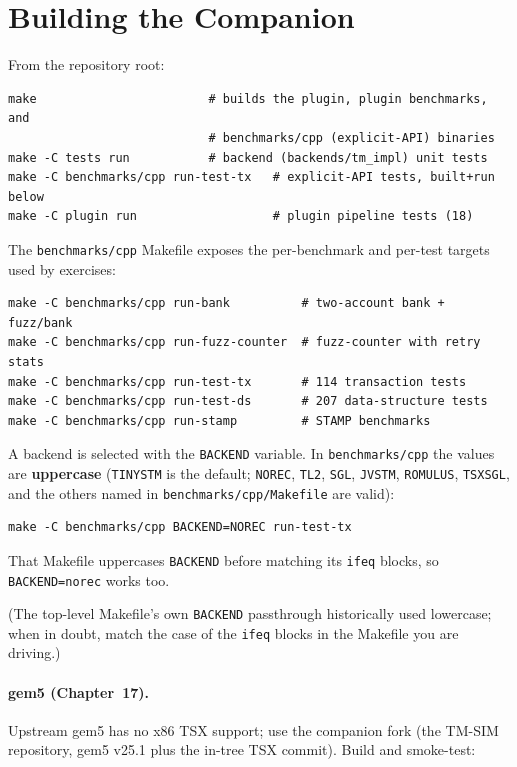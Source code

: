 \section{Building the Companion}

From the repository root:

\begin{verbatim}
make                        # builds the plugin, plugin benchmarks, and
                            # benchmarks/cpp (explicit-API) binaries
make -C tests run           # backend (backends/tm_impl) unit tests
make -C benchmarks/cpp run-test-tx   # explicit-API tests, built+run below
make -C plugin run                   # plugin pipeline tests (18)
\end{verbatim}

The \texttt{benchmarks/cpp} Makefile exposes the per-benchmark and per-test
targets used by exercises:

\begin{verbatim}
make -C benchmarks/cpp run-bank          # two-account bank + fuzz/bank
make -C benchmarks/cpp run-fuzz-counter  # fuzz-counter with retry stats
make -C benchmarks/cpp run-test-tx       # 114 transaction tests
make -C benchmarks/cpp run-test-ds       # 207 data-structure tests
make -C benchmarks/cpp run-stamp         # STAMP benchmarks
\end{verbatim}

A backend is selected with the \texttt{BACKEND} variable. In
\texttt{benchmarks/cpp} the values are \textbf{uppercase}
(\texttt{TINYSTM} is the default; \texttt{NOREC}, \texttt{TL2},
\texttt{SGL}, \texttt{JVSTM}, \texttt{ROMULUS}, \texttt{TSXSGL}, and the
others named in \texttt{benchmarks/cpp/Makefile} are valid):

\begin{verbatim}
make -C benchmarks/cpp BACKEND=NOREC run-test-tx
\end{verbatim}

That Makefile uppercases \texttt{BACKEND} before matching its
\texttt{ifeq} blocks, so \texttt{BACKEND=norec} works too.

(The top-level Makefile's own \texttt{BACKEND} passthrough historically
used lowercase; when in doubt, match the case of the \texttt{ifeq} blocks
in the Makefile you are driving.)

\paragraph{gem5 (Chapter~17).} Upstream gem5 has no x86 TSX support; use
the companion fork (the \textsc{TM-SIM} repository, gem5 v25.1 plus the
in-tree TSX commit). Build and smoke-test:

